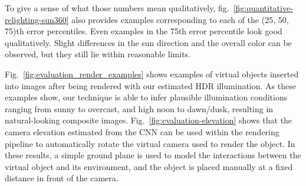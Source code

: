 To give a sense of what those numbers mean qualitatively, fig.~\ref{fig:quantitative-relighting-sun360} also provides examples corresponding to each of the (25, 50, 75)th error percentiles. Even examples in the 75th error percentile look good qualitatively. Slight differences in the sun direction and the overall color can be observed, but they still lie within reasonable limits.

Fig.~\ref{fig:evaluation_render_examples} shows examples of virtual objects inserted into images after being rendered with our estimated HDR illumination. As these examples show, our technique is able to infer plausible illumination conditions ranging from sunny to overcast, and high noon to dawn/dusk, resulting in natural-looking composite images. Fig.~\ref{fig:evaluation-elevation} shows that the camera elevation estimated from the CNN can be used within the rendering pipeline to automatically rotate the virtual camera used to render the object. In these results, a simple ground plane is used to model the interactions between the virtual object and its environment, and the object is placed manually at a fixed distance in front of the camera.


